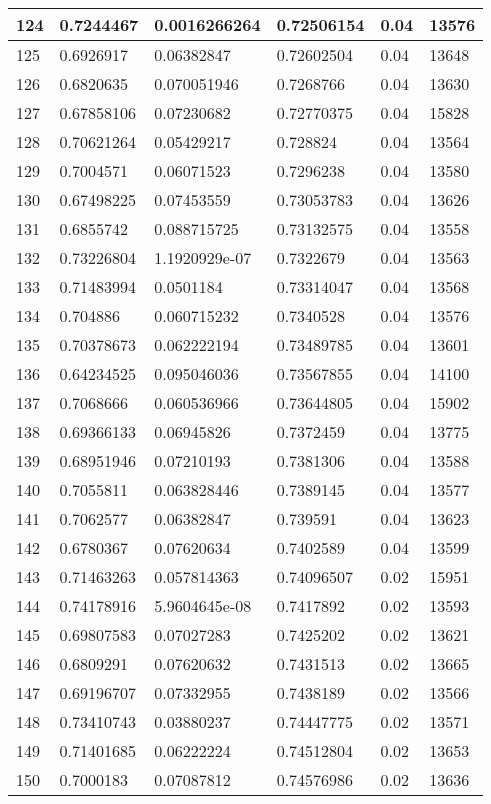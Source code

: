 \begin{longtable}{|l|l|l|l|l|l|}
124 & 0.7244467 & 0.0016266264 & 0.72506154 & 0.04 & 13576 \\ \hline 
125 & 0.6926917 & 0.06382847 & 0.72602504 & 0.04 & 13648 \\ \hline 
126 & 0.6820635 & 0.070051946 & 0.7268766 & 0.04 & 13630 \\ \hline 
127 & 0.67858106 & 0.07230682 & 0.72770375 & 0.04 & 15828 \\ \hline 
128 & 0.70621264 & 0.05429217 & 0.728824 & 0.04 & 13564 \\ \hline 
129 & 0.7004571 & 0.06071523 & 0.7296238 & 0.04 & 13580 \\ \hline 
130 & 0.67498225 & 0.07453559 & 0.73053783 & 0.04 & 13626 \\ \hline 
131 & 0.6855742 & 0.088715725 & 0.73132575 & 0.04 & 13558 \\ \hline 
132 & 0.73226804 & 1.1920929e-07 & 0.7322679 & 0.04 & 13563 \\ \hline 
133 & 0.71483994 & 0.0501184 & 0.73314047 & 0.04 & 13568 \\ \hline 
134 & 0.704886 & 0.060715232 & 0.7340528 & 0.04 & 13576 \\ \hline 
135 & 0.70378673 & 0.062222194 & 0.73489785 & 0.04 & 13601 \\ \hline 
136 & 0.64234525 & 0.095046036 & 0.73567855 & 0.04 & 14100 \\ \hline 
137 & 0.7068666 & 0.060536966 & 0.73644805 & 0.04 & 15902 \\ \hline 
138 & 0.69366133 & 0.06945826 & 0.7372459 & 0.04 & 13775 \\ \hline 
139 & 0.68951946 & 0.07210193 & 0.7381306 & 0.04 & 13588 \\ \hline 
140 & 0.7055811 & 0.063828446 & 0.7389145 & 0.04 & 13577 \\ \hline 
141 & 0.7062577 & 0.06382847 & 0.739591 & 0.04 & 13623 \\ \hline 
142 & 0.6780367 & 0.07620634 & 0.7402589 & 0.04 & 13599 \\ \hline 
143 & 0.71463263 & 0.057814363 & 0.74096507 & 0.02 & 15951 \\ \hline 
144 & 0.74178916 & 5.9604645e-08 & 0.7417892 & 0.02 & 13593 \\ \hline 
145 & 0.69807583 & 0.07027283 & 0.7425202 & 0.02 & 13621 \\ \hline 
146 & 0.6809291 & 0.07620632 & 0.7431513 & 0.02 & 13665 \\ \hline 
147 & 0.69196707 & 0.07332955 & 0.7438189 & 0.02 & 13566 \\ \hline 
148 & 0.73410743 & 0.03880237 & 0.74447775 & 0.02 & 13571 \\ \hline 
149 & 0.71401685 & 0.06222224 & 0.74512804 & 0.02 & 13653 \\ \hline 
150 & 0.7000183 & 0.07087812 & 0.74576986 & 0.02 & 13636 \\ \hline 
\end{longtable}